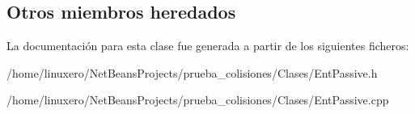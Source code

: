 \subsection*{Otros miembros heredados}


La documentación para esta clase fue generada a partir de los siguientes ficheros\-:\begin{DoxyCompactItemize}
\item 
/home/linuxero/\-Net\-Beans\-Projects/prueba\-\_\-colisiones/\-Clases/Ent\-Passive.\-h\item 
/home/linuxero/\-Net\-Beans\-Projects/prueba\-\_\-colisiones/\-Clases/Ent\-Passive.\-cpp\end{DoxyCompactItemize}
